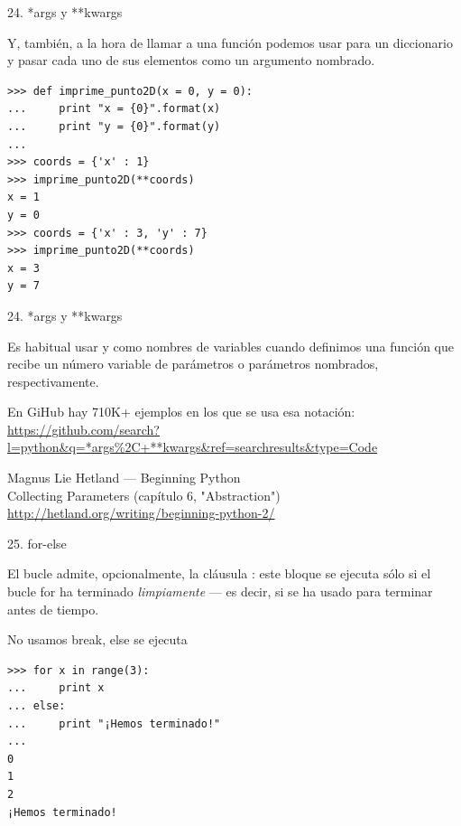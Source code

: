 \documentclass[14pt]{beamer}
\begin{document}
\begin{frame}[fragile]{24. *args y **kwargs}
  \begin{block}{}
    \small
    \centering
    Y, también, a la hora de llamar a una función podemos usar
    \structure{**} para  un diccionario y
    pasar cada uno de sus elementos como un argumento nombrado.
  \end{block}

  \begin{exampleblock}{}
    \scriptsize
    \begin{lstlisting}
>>> def imprime_punto2D(x = 0, y = 0):
...     print "x = {0}".format(x)
...     print "y = {0}".format(y)
...
>>> coords = {'x' : 1}
>>> imprime_punto2D(**coords)
x = 1
y = 0
>>> coords = {'x' : 3, 'y' : 7}
>>> imprime_punto2D(**coords)
x = 3
y = 7
    \end{lstlisting}
  \end{exampleblock}
\end{frame}

\begin{frame}[fragile]{24. *args y **kwargs}
  \begin{block}{}
    \small
    \centering
    Es habitual usar  y  como
    nombres de variables cuando definimos una función que recibe un
    número variable de parámetros o parámetros nombrados,
    respectivamente.
  \end{block}

  \footnotesize
  \begin{block}
    {\centering
      En GiHub hay 710K+ ejemplos en los que se usa esa notación:}
    \centering
    \url{https://github.com/search?l=python&q=*args\%2C+**kwargs&ref=searchresults&type=Code}
  \end{block}

\begin{block}
    {\centering
      Magnus Lie Hetland — Beginning Python \\
      Collecting Parameters (capítulo 6, "Abstraction")
    }
    \centering \url{http://hetland.org/writing/beginning-python-2/}
  \end{block}
\end{frame}

\begin{frame}[fragile]{25. for-else}
  \begin{block}{}
    \centering
    \small
    El bucle  admite, opcionalmente, la cláusula
    : este bloque se ejecuta sólo si el bucle for ha
    terminado \emph{limpiamente} --- es decir, si  se ha
    usado  para terminar antes de tiempo.
  \end{block}

  \small
  \begin{exampleblock}
    {No usamos break, else se ejecuta}
    \begin{lstlisting}
>>> for x in range(3):
...     print x
... else:
...     print "¡Hemos terminado!"
...
0
1
2
¡Hemos terminado!
    \end{lstlisting}
  \end{exampleblock}
\end{frame}
\end{document}

